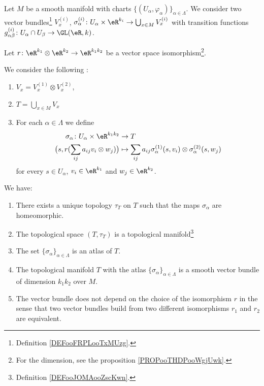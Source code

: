 \begin{propositionDef}		\label{DEFooCSDZooJuzGuE}
	Let \( M \) be a smooth manifold with charts \( \{ (U_{\alpha},\varphi_{\alpha}) \}_{\alpha\in\Lambda}\). We consider two vector bundles\footnote{Definition \ref{DEFooFRPLooTxMUzg}.} \( V_x^{(i)}\), \( \sigma_{\alpha}^{(i)}  \colon U_{\alpha}\times \eR^{k_i}\to \bigcup_{x\in M}V_x^{(i)} \) with transition functions \(g_{\alpha\beta}^{(i)} \colon U_{\alpha}\cap U_{\beta}\to \GL(\eR,k)  \).

	Let \(r \colon \eR^{k_1}\otimes \eR^{k_2}\to \eR^{k_1k_2}  \) be a vector space isomorphism\footnote{For the dimension, see the proposition \ref{PROPooTHDPooWgjUwk}.}.

	We consider the following :
	\begin{enumerate}
		\item
		      \( V_x=V_x^{(1)}\otimes V_x^{(2)}\),
		\item
		      \( T=\bigcup_{x\in M}V_x\)
		\item For each \( \alpha\in \Lambda\) we define
		      \begin{equation}		\label{EQooXHURooBpOMlU}
			      \begin{aligned}
				      \sigma_{\alpha}\colon U_{\alpha}\times \eR^{k_1k_2} & \to T                                                                                   \\
				      \big( s, r(\sum_{ij}a_{ij} v_i\otimes w_j) \big)    & \mapsto \sum_{ij}a_{ij}\sigma_{\alpha}^{(1)}(s,v_i)\otimes \sigma_{\alpha}^{(2)}(s,w_j)
			      \end{aligned}
		      \end{equation}
		      for every \( s\in U_{\alpha}\), \( v_i\in \eR^{k_1}\) and \( w_j\in \eR^{k_2}\).
	\end{enumerate}

	We have:
	\begin{enumerate}
		\item \label{ITEMooDTGOooSCsElj}
		      There exists a unique topology \( \tau_T\) on \( T\) such that the maps \( \sigma_{\alpha}\) are homeomorphic.
		\item		\label{ITEMooRALUooFvLQaV}
		      The topological space \( (T,\tau_T)\) is a topological manifold\footnote{Definition \ref{DEFooJOMAooZscKwn}.}
		\item
		      The set \( \{ \sigma_{\alpha} \}_{\alpha\in\Lambda}\) is an atlas of \( T\).
		\item
		      The topological manifold \( T\) with the atlas \( \{ \sigma_{\alpha} \}_{\alpha\in \Lambda}\) is a smooth vector bundle of dimension \( k_1k_2\) over \( M\).
		\item
		      The vector bundle does not depend on the choice of the isomorphism \( r\) in the sense that two vector bundles build from two different isomorphisms \( r_1\) and \( r_2\) are equivalent.
	\end{enumerate}
\end{propositionDef}

